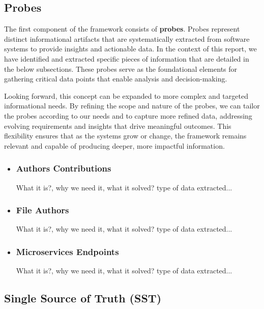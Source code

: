\subsection{Probes}\label{subsec:component-probes}

The first component of the framework consists of \textbf{probes}. Probes represent distinct informational artifacts that are systematically extracted from software systems to provide insights and actionable data. In the context of this report, we have identified and extracted specific pieces of information that are detailed in the below subsections. These probes serve as the foundational elements for gathering critical data points that enable analysis and decision-making. 

Looking forward, this concept can be expanded to more complex and targeted informational needs. By refining the scope and nature of the probes, we can tailor the probes according to our needs and to capture more refined data, addressing evolving requirements and insights that drive meaningful outcomes. This flexibility ensures that as the systems grow or change, the framework remains relevant and capable of producing deeper, more impactful information.

\begin{itemize}[leftmargin=*, label=$\bullet$]

    \item \subsubsection*{Authors Contributions}
    What it is?, why we need it, what it solved? type of data extracted... 
    \item \subsubsection*{File Authors}
    What it is?, why we need it, what it solved? type of data extracted... 
    \item \subsubsection*{Microservices Endpoints}
    What it is?, why we need it, what it solved? type of data extracted... 

\end{itemize}

\subsection{Single Source of Truth (SST)}\label{subsec:component-sst}
